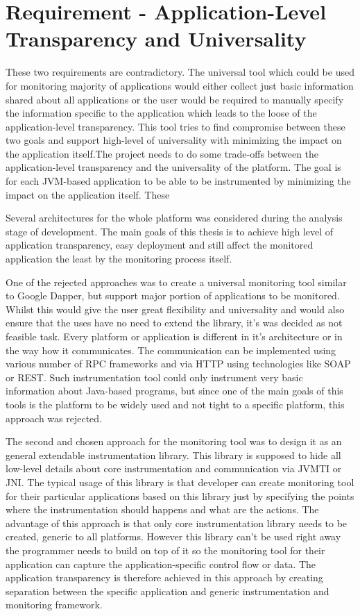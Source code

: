 \section{Requirement - Application-Level \newline Transparency and Universality}
These two requirements are contradictory. The universal tool which could be used for monitoring majority of applications would either collect just basic information shared about all applications or the user would be required to manually specify the information specific to the application which leads to the loose of the application-level transparency. This tool tries to find compromise between these two goals and support high-level of universality with minimizing the impact on the application itself.The project needs to do some trade-offs between the application-level transparency and the universality of the platform. The goal is for each JVM-based application to be able to be instrumented by minimizing the impact on the application itself. These 


Several architectures for the whole platform was considered during the analysis stage of development. The main goals of this thesis is to achieve high level of application transparency, easy deployment and still affect the monitored application the least by the monitoring process itself.

One of the rejected approaches was to create a universal monitoring tool similar to Google Dapper, but support major portion of applications to be monitored. Whilst this would give the user great flexibility and universality and would also ensure that the uses have no need to extend the library, it's was decided as not feasible task. Every platform or application is different in it's architecture or in the way how it communicates. The communication can be implemented using various number of RPC frameworks and via HTTP using technologies like SOAP or REST.
Such instrumentation tool could only instrument very basic information about Java-based programs, but since one of the main goals of this tools is the platform to be widely used and not tight to a specific platform, this approach was rejected.

The second and chosen approach for the monitoring tool was to design it as an general extendable instrumentation library. This library is supposed to hide all low-level details about core instrumentation and communication via JVMTI or JNI. The typical usage of this library is that developer can create monitoring tool for their particular applications based on this library just by specifying the points where the instrumentation should happens and what are the actions. The advantage of this approach is that only core instrumentation library needs to be created, generic to all platforms. However this library can't be used right away the programmer needs to build on top of it  so the monitoring tool for their application can capture the application-specific control flow or data. The application transparency is therefore achieved in this approach by creating separation between the specific application and generic instrumentation and monitoring framework.




